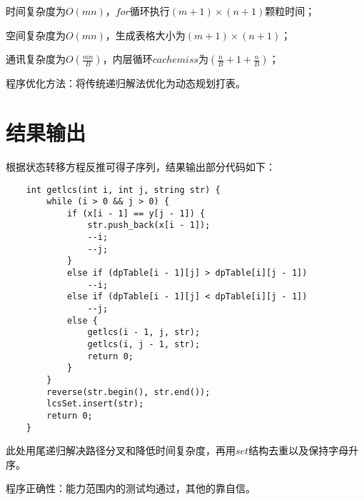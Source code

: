 \documentclass[11pt]{article}
\begin{document}
时间复杂度为$ O(mn) $，$ for $循环执行$ (m+1)\times (n+1) $颗粒时间；

空间复杂度为$ O(mn) $，生成表格大小为$ (m+1)\times (n+1) $；

通讯复杂度为$ O\left(\frac{mn}{B}\right) $，内层循环$ cache miss $为$ \left(\frac{n}{B}+1+\frac{n}{B}\right) $；

程序优化方法：将传统递归解法优化为动态规划打表。


\section{结果输出}

根据状态转移方程反推可得子序列，结果输出部分代码如下：

\begin{lstlisting}
	int getlcs(int i, int j, string str) {
		while (i > 0 && j > 0) {
			if (x[i - 1] == y[j - 1]) {
				str.push_back(x[i - 1]);
				--i;
				--j;
			}
			else if (dpTable[i - 1][j] > dpTable[i][j - 1])
				--i;
			else if (dpTable[i - 1][j] < dpTable[i][j - 1])
				--j;
			else {
				getlcs(i - 1, j, str);
				getlcs(i, j - 1, str);
				return 0;
			}
		}
		reverse(str.begin(), str.end());
		lcsSet.insert(str);
		return 0;
	}
\end{lstlisting}

此处用尾递归解决路径分叉和降低时间复杂度，再用$ set $结构去重以及保持字母升序。

程序正确性：能力范围内的测试均通过，其他的靠自信。
\end{document}
